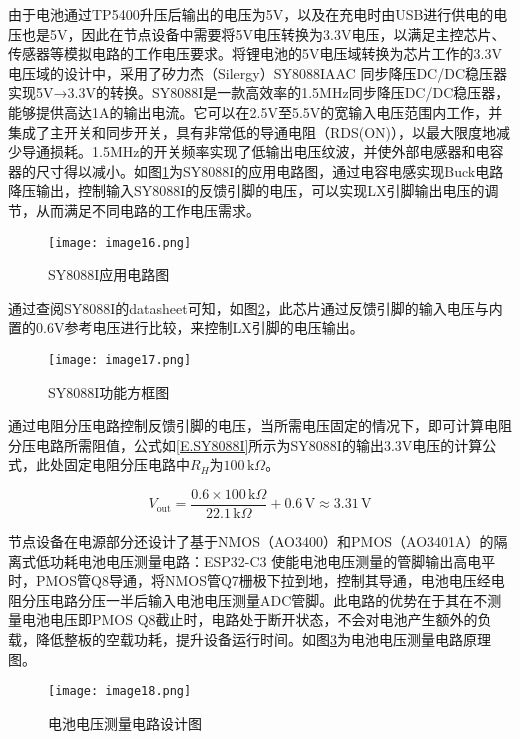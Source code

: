 由于电池通过TP5400升压后输出的电压为5V，以及在充电时由USB进行供电的电压也是5V，因此在节点设备中需要将5V电压转换为3.3V电压，以满足主控芯片、传感器等模拟电路的工作电压要求。将锂电池的5V电压域转换为芯片工作的3.3V电压域的设计中，采用了矽力杰（Silergy）SY8088IAAC 同步降压DC/DC稳压器实现5V→3.3V的转换。SY8088I是一款高效率的1.5MHz同步降压DC/DC稳压器，能够提供高达1A的输出电流。它可以在2.5V至5.5V的宽输入电压范围内工作，并集成了主开关和同步开关，具有非常低的导通电阻（RDS(ON)），以最大限度地减少导通损耗\cite{SY8088}。1.5MHz的开关频率实现了低输出电压纹波，并使外部电感器和电容器的尺寸得以减小。如图\ref{F.ECG_image16}为SY8088I的应用电路图，通过电容电感实现Buck电路降压输出，控制输入SY8088I的反馈引脚的电压，可以实现LX引脚输出电压的调节，从而满足不同电路的工作电压需求。

\begin{figure}[hbt]
    \centering
    \texttt{[image: image16.png]}
    \caption{SY8088I应用电路图}
    \label{F.ECG_image16}
\end{figure}

通过查阅SY8088I的datasheet可知，如图\ref{F.ECG_image17}，此芯片通过反馈引脚的输入电压与内置的0.6V参考电压进行比较，来控制LX引脚的电压输出。

\begin{figure}[hbt]
    \centering
    \texttt{[image: image17.png]}
    \caption{SY8088I功能方框图}
    \label{F.ECG_image17}
\end{figure}

通过电阻分压电路控制反馈引脚的电压，当所需电压固定的情况下，即可计算电阻分压电路所需阻值，公式如\ref{E.SY8088I}所示为SY8088I的输出3.3V电压的计算公式，此处固定电阻分压电路中$R_H$为$100\,\text{k}\Omega$。

\begin{equation}
        V_{\text{out}} = \frac{0.6 \times 100\,\text{k}\Omega}{22.1\,\text{k}\Omega} + 0.6\,\text{V} \approx 3.31\,\text{V}
    \label{E.SY8088I}
\end{equation}

节点设备在电源部分还设计了基于NMOS（AO3400）和PMOS（AO3401A）的隔离式低功耗电池电压测量电路：ESP32-C3 使能电池电压测量的管脚输出高电平时，PMOS管Q8导通，将NMOS管Q7栅极下拉到地，控制其导通，电池电压经电阻分压电路分压一半后输入电池电压测量ADC管脚。此电路的优势在于其在不测量电池电压即PMOS Q8截止时，电路处于断开状态，不会对电池产生额外的负载，降低整板的空载功耗，提升设备运行时间。如图\ref{F.ECG_image18}为电池电压测量电路原理图。

\begin{figure}[hbt]
    \centering
    \texttt{[image: image18.png]}
    \caption{电池电压测量电路设计图}
    \label{F.ECG_image18}
\end{figure}

